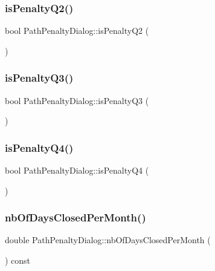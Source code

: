 \subsubsection{\texorpdfstring{isPenaltyQ2()}{isPenaltyQ2()}}
{\footnotesize\ttfamily bool Path\+Penalty\+Dialog\+::is\+Penalty\+Q2 (\begin{DoxyParamCaption}{ }\end{DoxyParamCaption})}

\mbox{\label{class_path_penalty_dialog_aef3d0a7df824dd86e1afeaea8e3c5521}} 
\subsubsection{\texorpdfstring{isPenaltyQ3()}{isPenaltyQ3()}}
{\footnotesize\ttfamily bool Path\+Penalty\+Dialog\+::is\+Penalty\+Q3 (\begin{DoxyParamCaption}{ }\end{DoxyParamCaption})}

\mbox{\label{class_path_penalty_dialog_af611f8283343f98b89922a356d1f3041}} 
\subsubsection{\texorpdfstring{isPenaltyQ4()}{isPenaltyQ4()}}
{\footnotesize\ttfamily bool Path\+Penalty\+Dialog\+::is\+Penalty\+Q4 (\begin{DoxyParamCaption}{ }\end{DoxyParamCaption})}

\mbox{\label{class_path_penalty_dialog_a16026d938b480060797b3e1812b1a4a0}} 
\subsubsection{\texorpdfstring{nbOfDaysClosedPerMonth()}{nbOfDaysClosedPerMonth()}}
{\footnotesize\ttfamily double Path\+Penalty\+Dialog\+::nb\+Of\+Days\+Closed\+Per\+Month (\begin{DoxyParamCaption}{ }\end{DoxyParamCaption}) const}

